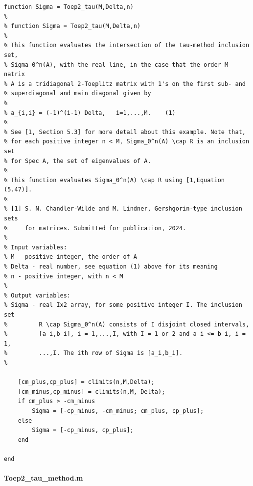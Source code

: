 \documentclass[preprint,1p,11pt]{elsarticle}
\numberwithin{equation}{section}   %
\numberwithin{figure}{section}  %
\begin{document}
\begin{verbatim}
function Sigma = Toep2_tau(M,Delta,n)
%
% function Sigma = Toep2_tau(M,Delta,n)
%
% This function evaluates the intersection of the tau-method inclusion set, 
% Sigma_0^n(A), with the real line, in the case that the order M natrix
% A is a tridiagonal 2-Toeplitz matrix with 1's on the first sub- and 
% superdiagonal and main diagonal given by
% 
% a_{i,i} = (-1)^(i-1) Delta,   i=1,...,M.    (1)
% 
% See [1, Section 5.3] for more detail about this example. Note that, 
% for each positive integer n < M, Sigma_0^n(A) \cap R is an inclusion set 
% for Spec A, the set of eigenvalues of A. 
% 
% This function evaluates Sigma_0^n(A) \cap R using [1,Equation (5.47)].
%
% [1] S. N. Chandler-Wilde and M. Lindner, Gershgorin-type inclusion sets
%     for matrices. Submitted for publication, 2024.
%
% Input variables:
% M - positive integer, the order of A
% Delta - real number, see equation (1) above for its meaning
% n - positive integer, with n < M
%
% Output variables:
% Sigma - real Ix2 array, for some positive integer I. The inclusion set
%         R \cap Sigma_0^n(A) consists of I disjoint closed intervals,
%         [a_i,b_i], i = 1,...,I, with I = 1 or 2 and a_i <= b_i, i = 1,
%         ...,I. The ith row of Sigma is [a_i,b_i].
%
    
    [cm_plus,cp_plus] = climits(n,M,Delta);
    [cm_minus,cp_minus] = climits(n,M,-Delta);
    if cm_plus > -cm_minus
        Sigma = [-cp_minus, -cm_minus; cm_plus, cp_plus];
    else
        Sigma = [-cp_minus, cp_plus];
    end

end
\end{verbatim}

\paragraph{Toep2\_tau\_method.m}
\end{document}
